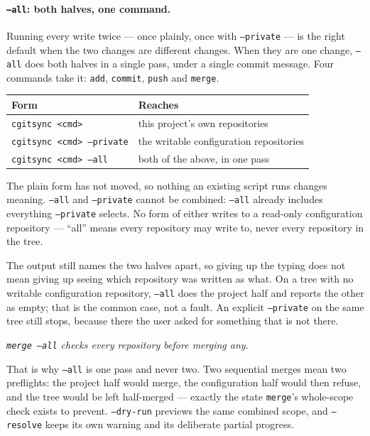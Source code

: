 \paragraph{\texttt{--all}: both halves, one command.} Running every write
twice --- once plainly, once with \texttt{--private} --- is the right
default when the two changes are different changes. When they are one
change, \texttt{--all} does both halves in a single pass, under a single
commit message. Four commands take it: \texttt{add}, \texttt{commit},
\texttt{push} and \texttt{merge}.

\begin{center}
\begin{tabular}{ll}
\textbf{Form} & \textbf{Reaches} \\
\hline
\texttt{cgitsync <cmd>}           & this project's own repositories \\
\texttt{cgitsync <cmd> --private} & the writable configuration repositories \\
\texttt{cgitsync <cmd> --all}     & both of the above, in one pass \\
\end{tabular}
\end{center}

The plain form has not moved, so nothing an existing script runs changes
meaning. \texttt{--all} and \texttt{--private} cannot be combined:
\texttt{--all} already includes everything \texttt{--private} selects. No
form of either writes to a read-only configuration repository --- ``all''
means every repository \cgscli{} may write to, never every repository in
the tree.

The output still names the two halves apart, so giving up the typing does
not mean giving up seeing which repository was written as what. On a tree
with no writable configuration repository, \texttt{--all} does the project
half and reports the other as empty; that is the common case, not a fault.
An explicit \texttt{--private} on the same tree still stops, because there
the user asked for something that is not there.

\begin{center}
\emph{\texttt{merge --all} checks every repository before merging any.}
\end{center}

That is why \texttt{--all} is one pass and never two. Two sequential merges
mean two preflights: the project half would merge, the configuration half
would then refuse, and the tree would be left half-merged --- exactly the
state \texttt{merge}'s whole-scope check exists to prevent.
\texttt{--dry-run} previews the same combined scope, and \texttt{--resolve}
keeps its own warning and its deliberate partial progress.

